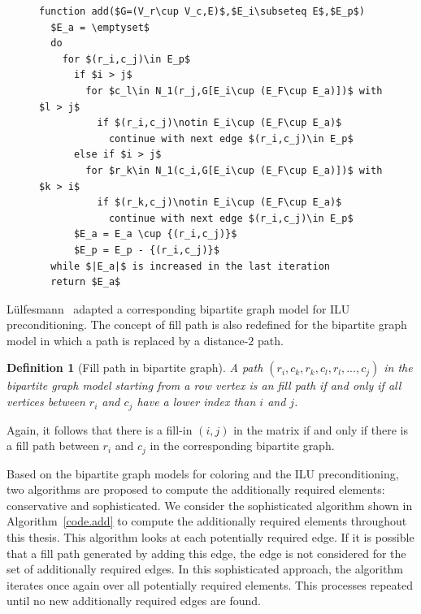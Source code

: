 \documentclass[12pt, twoside,a4paper,toc=bibliography]{scrbook}
\newtheorem{definition}{Definition}
\newcommand{\coderef}[1]{Algorithm~\protect\ref{#1}}
\begin{document}
\begin{figure}
\begin{lstlisting}[caption=Find additionally required elements,
label=code.add,mathescape]
function add($G=(V_r\cup V_c,E)$,$E_i\subseteq E$,$E_p$)
  $E_a = \emptyset$
  do
    for $(r_i,c_j)\in E_p$
      if $i > j$
        for $c_l\in N_1(r_j,G[E_i\cup (E_F\cup E_a)])$ with $l > j$
          if $(r_i,c_j)\notin E_i\cup (E_F\cup E_a)$
            continue with next edge $(r_i,c_j)\in E_p$
      else if $i > j$
        for $r_k\in N_1(c_i,G[E_i\cup (E_F\cup E_a)])$ with $k > i$
          if $(r_k,c_j)\notin E_i\cup (E_F\cup E_a)$
            continue with next edge $(r_i,c_j)\in E_p$
      $E_a = E_a \cup {(r_i,c_j)}$
      $E_p = E_p - {(r_i,c_j)}$
  while $|E_a|$ is increased in the last iteration
  return $E_a$
\end{lstlisting}
\end{figure}
Lülfesmann~\cite{Lulfesmann2012Fap} adapted a
corresponding bipartite graph model for ILU preconditioning.
The concept of fill path is also redefined for the bipartite graph model
in which a path is replaced by a distance-$2$ path.
\begin{definition}[Fill path in bipartite graph]\label{d.fill.path.bipartite}
A path $(r_i,c_k,r_k,c_l,r_l,...,c_j)$ in the bipartite graph model starting
from a row vertex is an fill path 
if and only if all vertices between $r_i$ and $c_j$ have a lower index than $i$
and $j$. 
\end{definition}
Again, it follows that 
there is a fill-in $(i,j)$ in the matrix if and only if there is a
fill path between $r_i$ and $c_j$ in the corresponding bipartite graph.

Based on the bipartite graph models for coloring and the ILU preconditioning,
two algorithms are proposed to compute the additionally required
elements: conservative and sophisticated. 
We consider the sophisticated algorithm shown in \coderef{code.add}
to compute the additionally required elements
throughout this thesis. This algorithm looks at each potentially required edge.
If it is possible that a fill path generated by adding this edge,
the edge is not considered for the set of additionally required edges.
In this sophisticated approach, the algorithm iterates once again over 
all potentially required elements. This processes repeated until 
no new additionally required edges are found.

\end{document}
